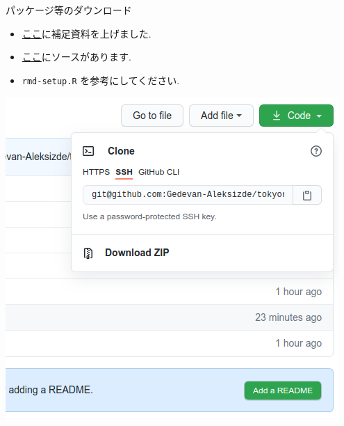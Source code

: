 \documentclass[
  ignorenonframetext,
]{beamer}
\providecommand{\tightlist}{%
  \setlength{\itemsep}{0pt}\setlength{\parskip}{0pt}}
\begin{document}
\begin{frame}[fragile]{パッケージ等のダウンロード}
\protect\hypertarget{ux30d1ux30c3ux30b1ux30fcux30b8ux7b49ux306eux30c0ux30a6ux30f3ux30edux30fcux30c9}{}
\begin{itemize}
\tightlist
\item
  \href{https://rpubs.com/ktgrstsh/755893}{ここ}に補足資料を上げました.
\item
  \href{https://github.com/Gedevan-Aleksizde/tokyor-91-rmd}{ここ}にソースがあります.
\item
  \texttt{rmd-setup.R} を参考にしてください.
\end{itemize}

\begin{center}\includegraphics[width=1\linewidth,height=1\textheight,keepaspectratio]{img/github} \end{center}
\end{frame}
\end{document}
